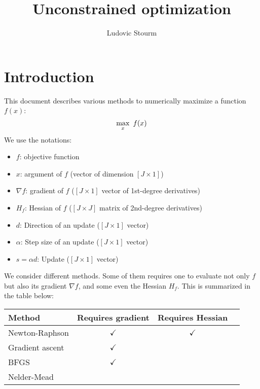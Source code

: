 \documentclass[12pt]{article}
\title{Unconstrained optimization}
\author{Ludovic Stourm}
\begin{document}
\maketitle

\section{Introduction}
This document describes various methods to numerically maximize a function $f(x)$:
\begin{equation}
	\underset{x}{\max} \hspace*{5pt} f(x)
\end{equation}
We use the notations:
\begin{itemize}
	\item $f$: objective function
	\item $x$: argument of $f$ (vector of dimension $[J \times 1]$)
	\item $\nabla f$: gradient of $f$ ($[J \times 1]$ vector of 1st-degree derivatives)
	\item $H_f$: Hessian of $f$ ($[J \times J]$ matrix of 2nd-degree derivatives)
	\item $d$: Direction of an update ($[J \times 1]$ vector)
	\item $\alpha$: Step size of an update ($[J \times 1]$ vector)
	\item $s = \alpha d$: Update ($[J \times 1]$ vector)
\end{itemize}
\vspace*{15pt}
We consider different methods. Some of them requires one to evaluate not only $f$ but also its gradient $\nabla f$, and some even the Hessian $H_f$. This is summarized in the table below:
\begin{center}
\begin{tabular}{|l|c|c|c}
	\hline
	Method & Requires gradient & Requires Hessian  \\ \hline
	Newton-Raphson		& $\checkmark$  & $\checkmark$   \\
	Gradient ascent		& $\checkmark$  &  \\
	BFGS				& $\checkmark$  &  \\
	Nelder-Mead			&   &  \\
	\hline
\end{tabular}
\end{center}
\end{document}
